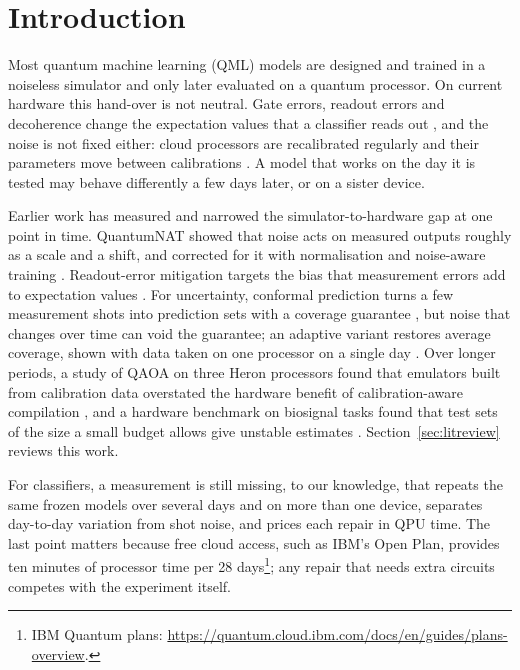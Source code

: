 \section{Introduction}
\label{sec:intro}

Most quantum machine learning (QML) models are designed and trained in a noiseless simulator
and only later evaluated on a quantum processor. On current hardware this hand-over is not
neutral. Gate errors, readout errors and decoherence change the expectation values that a
classifier reads out \cite{wang2021nibp,heyraud2022noisykernels}, and the noise is not fixed
either: cloud processors are recalibrated regularly and their parameters move between
calibrations \cite{realtimecal2023}. A model that works on the day it is tested may behave
differently a few days later, or on a sister device.

Earlier work has measured and narrowed the simulator-to-hardware gap at one point in time.
QuantumNAT showed that noise acts on measured outputs roughly as a scale and a shift, and
corrected for it with normalisation and noise-aware training \cite{wang2022quantumnat}.
Readout-error mitigation targets the bias that measurement errors add to expectation values
\cite{nation2021m3,vandenberg2022trex}. For uncertainty, conformal prediction turns a few
measurement shots into prediction sets with a coverage guarantee \cite{park2023qcp}, but noise
that changes over time can void the guarantee; an adaptive variant restores average coverage,
shown with data taken on one processor on a single day \cite{spencer2026aqcp}. Over longer
periods, a study of QAOA on three Heron processors found that emulators built from calibration
data overstated the hardware benefit of calibration-aware compilation \cite{qaoa2026drift}, and
a hardware benchmark on biosignal tasks found that test sets of the size a small budget allows
give unstable estimates \cite{qbiobench2026}. Section~\ref{sec:litreview} reviews this work.

For classifiers, a measurement is still missing, to our knowledge, that repeats the same frozen
models over several days and on more than one device, separates day-to-day variation from shot
noise, and prices each repair in QPU time. The last point matters because free cloud access,
such as IBM's Open Plan, provides ten minutes of processor time per 28
days\footnote{IBM Quantum plans:
\url{https://quantum.cloud.ibm.com/docs/en/guides/plans-overview}.}; any repair that needs
extra circuits competes with the experiment itself.

